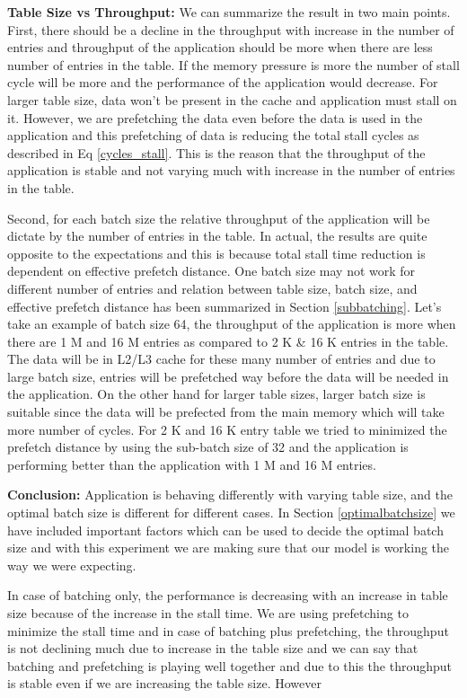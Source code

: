 \textbf{Table Size vs Throughput:} We can summarize the result in two main points. First, there should be a decline in the throughput with increase in the number of entries and throughput of the application should be more when there are less number of entries in the table. If the memory pressure is more the number of stall cycle will be more and the performance of the application would decrease. For larger table size, data won't be present in the cache and application must stall on it. However, we are prefetching the data even before the data is used in the application and this prefetching of data is reducing the total stall cycles as described in Eq \ref{cycles_stall}. This is the reason that the throughput of the application is stable and not varying much with increase in the number of entries in the table. 

Second, for each batch size the relative throughput of the application will be dictate by the number of entries in the table. In actual, the results are quite opposite to the expectations and this is because total stall time reduction is dependent on effective prefetch distance. One batch size may not work for different number of entries and relation between table size, batch size, and effective prefetch distance has been summarized in Section \ref{subbatching}. Let's take an example of batch size 64, the throughput of the application is more when there are 1 M and 16 M entries as compared to 2 K \& 16 K entries in the table. The data will be in L2/L3 cache for these many number of entries and due to large batch size, entries will be prefetched way before the data will be needed in the application. On the other hand for larger table sizes, larger batch size is suitable since the data will be prefected from the main memory which will take more number of cycles. For 2 K and 16 K entry table we tried to minimized the prefetch distance by using the sub-batch size of 32 and the application is performing better than the application with 1 M and 16 M entries.

\textbf{Conclusion:} 
Application is behaving differently with varying table size, and the optimal batch size is different for different cases. In Section \ref{optimalbatchsize} we have included important factors which can be used to decide the optimal batch size and with this experiment we are making sure that our model is working the way we were expecting.

In case of batching only, the performance is decreasing with an increase in table size because of the increase in the stall time. We are using prefetching to minimize the stall time and in case of batching plus prefetching, the throughput is not declining much due to increase in the table size and we can say that batching and prefetching is playing well together and due to this the throughput is stable even if we are increasing the table size. However 

